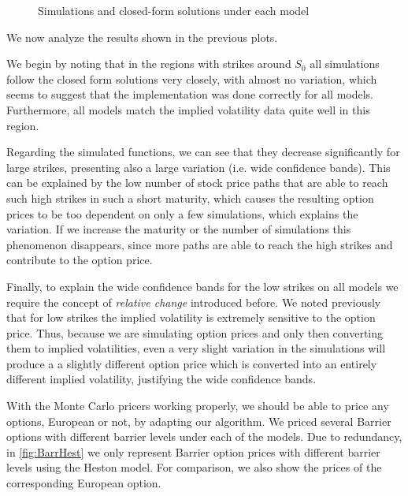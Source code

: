 \newpage
    
\begin{figure}[H]
  \begin{subfigmatrix}{1}
  \end{subfigmatrix}
  \caption{Simulations and closed-form solutions under each model}
\end{figure}
    
We now analyze the results shown in the previous plots.

We begin by noting that in the regions with strikes around $S_0$ all simulations follow the closed form solutions very closely, with almost no variation, which seems to suggest that the implementation was done correctly for all models. Furthermore, all models match the implied volatility data quite well in this region.

Regarding the simulated functions, we can see that they decrease significantly for large strikes, presenting also a large variation (i.e. wide confidence bands). This can be explained by the low number of stock price paths that are able to reach such high strikes in such a short maturity, which causes the resulting option prices to be too dependent on only a few simulations, which explains the variation. If we increase the maturity or the number of simulations this phenomenon disappears, since more paths are able to reach the high strikes and contribute to the option price.


Finally, to explain the wide confidence bands for the low strikes on all models we require the concept of \emph{relative change} introduced before. We noted previously that for low strikes the implied volatility is extremely sensitive to the option price. Thus, because we are simulating option prices and only then converting them to implied volatilities, even a very slight variation in the simulations will produce a a slightly different option price which is converted into an entirely different implied volatility, justifying the wide confidence bands.

With the Monte Carlo pricers working properly, we should be able to price any options, European or not, by adapting our algorithm.
We priced several Barrier options with different barrier levels under each of the models. Due to redundancy, in \autoref{fig:BarrHest} we only represent Barrier option prices with different barrier levels using the Heston model. For comparison, we also show the prices of the corresponding European option.

